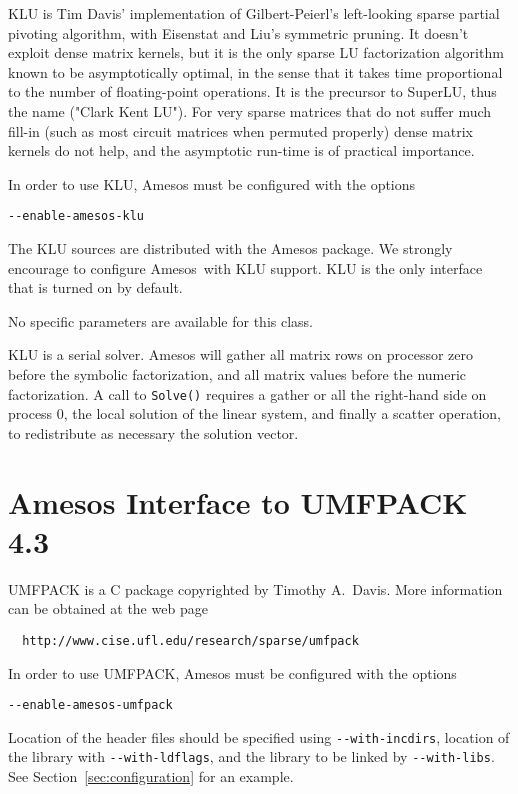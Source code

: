 \documentclass[11pt]{SANDreport}
\newcommand{\amesos}{{\sc Amesos}}
\begin{document}
KLU is Tim Davis' implementation of Gilbert-Peierl's left-looking sparse
partial pivoting algorithm, with Eisenstat and Liu's symmetric pruning.
It doesn't exploit dense matrix kernels, but it is the only sparse LU
factorization algorithm known to be asymptotically optimal, in the sense
that it takes time proportional to the number of floating-point
operations. It is the precursor to SuperLU, thus the name ("Clark Kent
LU"). For very sparse matrices that do not suffer much fill-in (such as
most circuit matrices when permuted properly) dense matrix kernels do
not help, and the asymptotic run-time is of practical importance.

\smallskip

In order to use KLU, Amesos must be configured with the options
\begin{verbatim}
--enable-amesos-klu
\end{verbatim}
The KLU sources are distributed with the Amesos package. We strongly encourage
to configure \amesos\ with KLU support. KLU is the only interface that is
turned on by default.

\smallskip

No specific parameters are available for this class.

\smallskip

KLU is a serial solver. Amesos will gather all matrix rows on processor
zero before the symbolic factorization, and all matrix values before the
numeric factorization. A call to \verb!Solve()! requires a gather
or all the right-hand side on process 0, the local solution of the linear
system, and finally a scatter operation, to redistribute as necessary the
solution vector.

\section{Amesos Interface to UMFPACK 4.3}
\label{sec:umfpack}

UMFPACK is a C package copyrighted by Timothy A.~Davis. More information
can be obtained at the web page
\begin{verbatim}
  http://www.cise.ufl.edu/research/sparse/umfpack
\end{verbatim}

In order to use UMFPACK, Amesos must be configured with the options
\begin{verbatim}
--enable-amesos-umfpack 
\end{verbatim}
Location of the header files should be specified using \verb!--with-incdirs!,
location of the library with \verb!--with-ldflags!, and the library
to be linked by \verb!--with-libs!. See Section~\ref{sec:configuration} for an
example.
\end{document}
